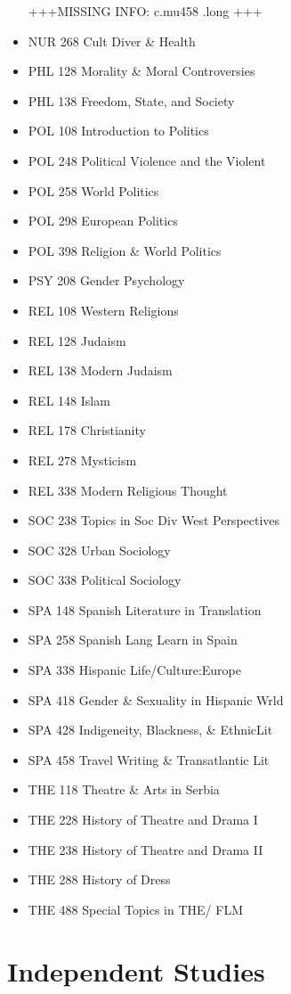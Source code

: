 \documentclass[
  letterpaper,
]{scrbook}
\begin{document}
\begin{itemize}
  +++MISSING INFO: c.mu458 .long +++
\item
  NUR 268 Cult Diver \& Health
\item
  PHL 128 Morality \& Moral Controversies
\item
  PHL 138 Freedom, State, and Society
\item
  POL 108 Introduction to Politics
\item
  POL 248 Political Violence and the Violent
\item
  POL 258 World Politics
\item
  POL 298 European Politics
\item
  POL 398 Religion \& World Politics
\item
  PSY 208 Gender Psychology
\item
  REL 108 Western Religions
\item
  REL 128 Judaism
\item
  REL 138 Modern Judaism
\item
  REL 148 Islam
\item
  REL 178 Christianity
\item
  REL 278 Mysticism
\item
  REL 338 Modern Religious Thought
\item
  SOC 238 Topics in Soc Div West Perspectives
\item
  SOC 328 Urban Sociology
\item
  SOC 338 Political Sociology
\item
  SPA 148 Spanish Literature in Translation
\item
  SPA 258 Spanish Lang Learn in Spain
\item
  SPA 338 Hispanic Life/Culture:Europe
\item
  SPA 418 Gender \& Sexuality in Hispanic Wrld
\item
  SPA 428 Indigeneity, Blackness, \& EthnicLit
\item
  SPA 458 Travel Writing \& Transatlantic Lit
\item
  THE 118 Theatre \& Arts in Serbia
\item
  THE 228 History of Theatre and Drama I
\item
  THE 238 History of Theatre and Drama II
\item
  THE 288 History of Dress
\item
  THE 488 Special Topics in THE/ FLM
\end{itemize}

\hypertarget{sec-independent-studies}{%
\section{Independent Studies}\label{sec-independent-studies}}
\end{document}

